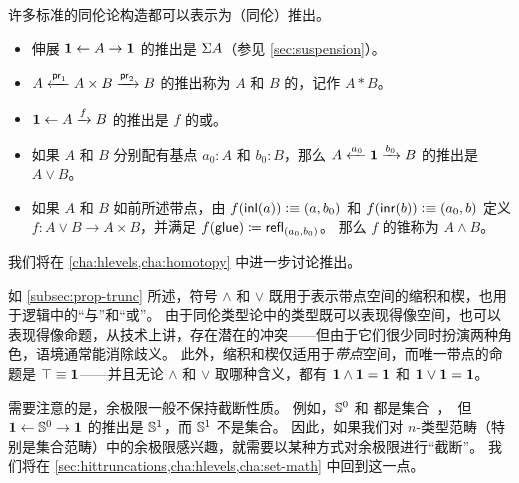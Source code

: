 许多标准的同伦论构造都可以表示为（同伦）推出。


\begin{itemize}
\item 伸展 $\mathbf{1} \leftarrow A \to \mathbf{1}$ 的推出是 $\Sigma A$（参见 \cref{sec:suspension}）。%
\item $A \xleftarrow{\mathsf{pr}_{1}} A\times B \xrightarrow{\mathsf{pr}_{2}} B$ 的推出称为 $A$ 和 $B$ 的，记作 $A*B$。%
\item $\mathbf{1} \leftarrow A \xrightarrow{f} B$ 的推出是 $f$ 的或。%
\item 如果 $A$ 和 $B$ 分别配有基点 $a_0:A$ 和 $b_0:B$，那么 $A \xleftarrow{a_0} \mathbf{1} \xrightarrow{b_0} B$ 的推出是 $A\vee B$。%
\item 如果 $A$ 和 $B$ 如前所述带点，由 $f({\mathsf{inl}}(a))\vcentcolon\equiv (a,b_0)$ 和 $f({\mathsf{inr}}(b))\vcentcolon\equiv (a_0,b)$ 定义 $f:A\vee B \to A\times B$，并满足 ${f}\mathopen{}\left({\mathsf{glue}}\right)\mathclose{} \coloneqq \mathsf{refl}_{(a_0,b_0)}$。
  那么 $f$ 的锥称为 $A\wedge B$。%
\end{itemize}


我们将在 \cref{cha:hlevels,cha:homotopy} 中进一步讨论推出。

\begin{rmk}
  如 \cref{subsec:prop-trunc} 所述，符号 $\wedge$ 和 $\vee$ 既用于表示带点空间的缩积和楔，也用于逻辑中的``与''和``或''。
  由于同伦类型论中的类型既可以表现得像空间，也可以表现得像命题，从技术上讲，存在潜在的冲突——但由于它们很少同时扮演两种角色，语境通常能消除歧义。
  此外，缩积和楔仅适用于\emph{带点}空间，而唯一带点的命题是 $\top\equiv\mathbf{1}$——并且无论 $\wedge$ 和 $\vee$ 取哪种含义，都有 $\mathbf{1}\wedge \mathbf{1} = \mathbf{1}$ 和 $\mathbf{1}\vee\mathbf{1}=\mathbf{1}$。
\end{rmk}

%

\begin{rmk}
  需要注意的是，余极限一般不保持截断性质。
  例如，$\mathbb{S}^0$ 和 \unit 都是集合，但 $\mathbf{1} \leftarrow \mathbb{S}^0 \to \mathbf{1}$ 的推出是 $\mathbb{S}^1$，而 $\mathbb{S}^1$ 不是集合。
  因此，如果我们对 $n$-类型范畴（特别是集合范畴）中的余极限感兴趣，就需要以某种方式对余极限进行``截断''。
  我们将在 \cref{sec:hittruncations,cha:hlevels,cha:set-math} 中回到这一点。
\end{rmk}

